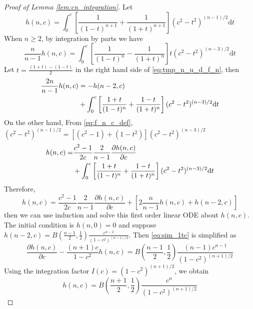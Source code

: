 \documentclass[conference,a4paper]{IEEEtran}
\def\dd{\mathrm{d}}
\begin{document}
\begin{proof}[Proof of Lemma \ref{lem:cn_integration}]
     Let
\begin{equation}\label{eq:f_n_c_def}
h(n,c)=   \int_0^{c}
    [\frac{1}{(1-t)^{n+1}}+\frac{1}{(1+t)^{n+1}}]
    (c^2- t^2)^{(n-1)/2}\dd t
\end{equation}
When $n\geq 2$, by integration by parts 
we have 
\begin{equation}\label{eq:tmp_n_u_d_f_n}
    \frac{n}{n-1}h(n,c)
    =\int_0^{c}
    \left[\frac{1}{(1-t)^{n}}
    -\frac{1}{(1+t)^{n}}
    \right]
    t(c^2- t^2)^{(n-3)/2}
    \dd t
\end{equation}
Let $t=\frac{(1+t)-(1-t)}{2}$ in the right hand side
of \eqref{eq:tmp_n_u_d_f_n}, then
\begin{align}
    \frac{2n}{n-1}h(n,c)
&=    -h(n-2,c)  
\notag\\
&+ \int_0^{c}
\left[\frac{1+t}{(1-t)^{n}}
+\frac{1-t}{(1+t)^{n}}
\right]
(c^2- t^2)^{(n-3)/2}
\dd t
\end{align}
On the other hand,
From \eqref{eq:f_n_c_def},
$(c^2-t^2)^{(n-1)/2}
=[(c^2-1)+(1-t^2)](c^2-t^2)^{(n-3)/2}$
\begin{align}
    h(n, c) =& \frac{c^2-1}{2c}\frac{2}{n-1}\frac{\partial h(n,c)}{\partial c}\notag\\
    &+  \int_0^{c}
    \left[\frac{1+t}{(1-t)^{n}}
    +\frac{1-t}{(1+t)^{n}}
    \right]
    (c^2- t^2)^{(n-3)/2}
    \dd t
\end{align}
Therefore,
\begin{equation}\label{eq:sim_1tc}
    h(n,c)=\frac{c^2-1}{2c}\frac{2}{n-1}\frac{\partial h(n,c)}{\partial c}
    + [2\frac{n}{n-1} h(n,c) + h(n-2, c)]
\end{equation}
then we can use induction and solve this
first order linear ODE about $h(n,c)$.
The initial condition is $h(n,0)=0$ and
suppose
$h(n-2,c)=B(\frac{n-1}{2}, \frac{1}{2})
\frac{c^{n-2}}{(1-c^2)^{(n-1)/2}}$.
Then \eqref{eq:sim_1tc} is simplified as
\begin{equation}
    \frac{\partial h(n,c)}{\partial c}
    - \frac{(n+1)c}{1-c^2} h(n,c)
    = B(\frac{n-1}{2}, \frac{1}{2})\frac{(n-1)c^{n-1}}{(1-c^2)^{(n+1)/2}}
\end{equation}
Using the integration factor $I(c)=(1-c^2)^{(n+1)/2}$, we obtain
\begin{equation}\label{eq:f_n_c_expression}
    h(n,c)= B(\frac{n+1}{2}, \frac{1}{2})
    \frac{c^n}{(1-c^2)^{(n+1)/2}}
\end{equation}

\end{proof}
\end{document}
